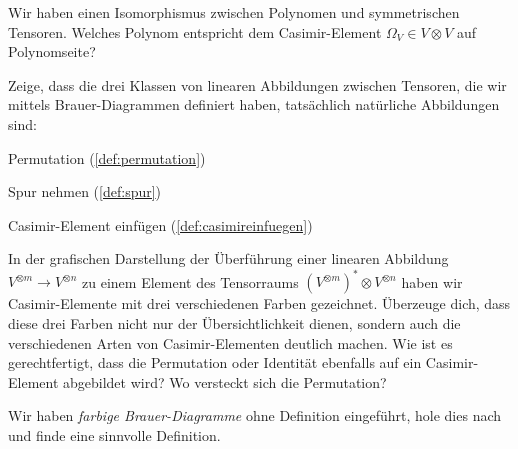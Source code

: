 \begin{sheet}

\begin{problem}[title={Casimir-Element der Polynome}]
Wir haben einen Isomorphismus zwischen Polynomen und symmetrischen Tensoren. Welches Polynom entspricht dem Casimir-Element $\Omega_V\in V\otimes V$ auf Polynomseite?
\end{problem}

\begin{problem}[title={Brauer-Diagramme sind natürliche Abbildungen}]
	\label{aufg:natAbbKlass}
	Zeige, dass die drei Klassen von linearen Abbildungen zwischen Tensoren, die wir mittels Brauer-Diagrammen definiert haben, tatsächlich natürliche Abbildungen sind:
	\begin{subproblem}
		Permutation (\ref{def:permutation})
	\end{subproblem}
	\begin{subproblem}
		Spur nehmen (\ref{def:spur})
	\end{subproblem}
	\begin{subproblem}
		Casimir-Element einfügen (\ref{def:casimireinfuegen})
	\end{subproblem}
\end{problem}

\begin{problem}[title={Bunte Casimir-Elemente}]
	In der grafischen Darstellung der Überführung einer linearen Abbildung $V^{\otimes m} \to V^{\otimes n}$ zu einem Element des Tensorraums $\left(V^{\otimes m}\right)^\ast \otimes V^{\otimes n}$ haben wir Casimir-Elemente mit drei verschiedenen Farben gezeichnet. Überzeuge dich, dass diese drei Farben nicht nur der Übersichtlichkeit dienen, sondern auch die verschiedenen Arten von Casimir-Elementen deutlich machen. Wie ist es gerechtfertigt, dass die Permutation oder Identität ebenfalls auf ein Casimir-Element abgebildet wird? Wo versteckt sich die Permutation?
	
	Wir haben \emph{farbige Brauer-Diagramme} ohne Definition eingeführt, hole dies nach und finde eine sinnvolle Definition.
\end{problem}


\end{sheet}
